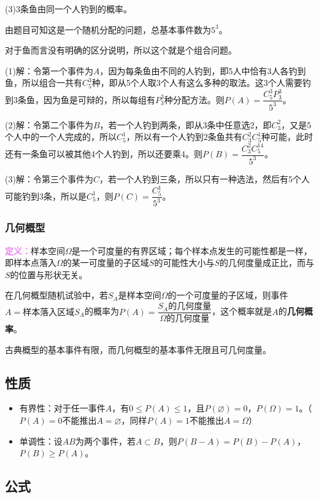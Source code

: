 \documentclass[UTF8, 12pt]{ctexart}
\begin{document}
(3)3条鱼由同一个人钓到的概率。

由题目可知这是一个随机分配的问题，总基本事件数为$5^3$。

对于鱼而言没有明确的区分说明，所以这个就是个组合问题。

(1)解：令第一个事件为$A$，因为每条鱼由不同的人钓到，即5人中恰有3人各钓到鱼，所以组合一共有$C_5^3$种，即从5个人取3个人有这么多种的取法。这3个人需要钓到3条鱼，因为鱼是可辩的，所以每组有$P_3^3$种分配方法。则$P(A)=\dfrac{C_5^3P_3^3}{5^3}$。

(2)解：令第二个事件为$B$，若一个人钓到两条，即从3条中任意选2，即$C_3^2$，又是5个人中的一个人完成的，所以$C_5^1$，所以有一个人钓到2条鱼共有$C_3^2C_5^1$种可能，此时还有一条鱼可以被其他4个人钓到，所以还要乘4。则$P(B)=\dfrac{C_3^2C_5^14}{5^3}$。

(3)解：令第三个事件为$C$，若一个人钓到三条，所以只有一种选法，然后有5个人可能钓到3条，所以是$C_5^1$，则$P(C)=\dfrac{C_5^1}{5^3}$。

\subsubsection{几何概型}

\textcolor{violet}{\textbf{定义：}}样本空间$\Omega$是一个可度量的有界区域；每个样本点发生的可能性都是一样，即样本点落入$\Omega$的某一可度量的子区域$S$的可能性大小与$S$的几何度量成正比，而与$S$的位置与形状无关。

在几何概型随机试验中，若$S_A$是样本空间$\Omega$的一个可度量的子区域，则事件$A={\text{样本落入区域}S_A}$的概率为$P(A)=\dfrac{S_A\text{的几何度量}}{\Omega\text{的几何度量}}$，这个概率就是$A$的\textbf{几何概率}。

古典概型的基本事件有限，而几何概型的基本事件无限且可几何度量。

\subsection{性质}

\begin{itemize}
    \item 有界性：对于任一事件$A$，有$0\leqslant P(A)\leqslant1$，且$P(\varnothing)=0$，$P(\Omega)=1$。（$P(A)=0$不能推出$A=\varnothing$，同样$P(A)=1$不能推出$A=\Omega$）
    \item 单调性：设$AB$为两个事件，若$A\subset B$，则$P(B-A)=P(B)-P(A)$，$P(B)\geqslant P(A)$。
\end{itemize}

\subsection{公式}
\end{document}
